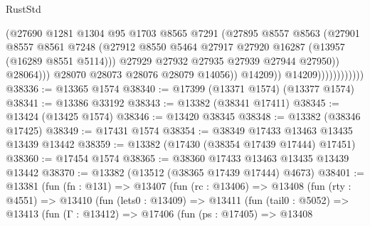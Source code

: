 \begin{lexlean}{RustStd}
\begin{coremodule}
                                        (@27690
                                          @1281
                                          @1304
                                          @95
                                          @1703
                                          @8565
                                          @7291
                                          (@27895
                                            @8557
                                            @8563
                                            (@27901
                                              @8557
                                              @8561
                                              @7248
                                              (@27912
                                                @8550
                                                @5464
                                                @27917
                                                @27920
                                                @16287
                                                (@13957 (@16289 @8551 @5114)))
                                              @27929
                                              @27932
                                              @27935
                                              @27939
                                              @27944
                                              @27950))
                                          @28064)))
                                    @28070
                                    @28073
                                    @28076
                                    @28079
                                    @14056))
                                @14209))
                            @14209))))))))))))
@38336 := @13365 @1574
@38340 := @17399 (@13371 @1574) (@13377 @1574)
@38341 := @13386 @33192
@38343 := @13382 (@38341 @17411)
@38345 := @13424 (@13425 @1574)
@38346 := @13420 @38345
@38348 := @13382 (@38346 @17425)
@38349 := @17431 @1574
@38354 := @38349 @17433 @13463 @13435 @13439 @13442
@38359 := @13382 (@17430 (@38354 @17439 @17444) @17451)
@38360 := @17454 @1574
@38365 := @38360 @17433 @13463 @13435 @13439 @13442
@38370 := @13382 (@13512 (@38365 @17439 @17444) @4673)
@38401 := @13381
    (fun (fn : @131) =>
    @13407
      (fun (rc : @13406) =>
      @13408
        (fun (rty : @4551) =>
        @13410
          (fun (lets0 : @13409) =>
          @13411
            (fun (tail0 : @5052) =>
            @13413
              (fun (Γ : @13412) =>
              @17406
                (fun (ps : @17405) =>
                @13408

\end{coremodule}
\end{lexlean}
